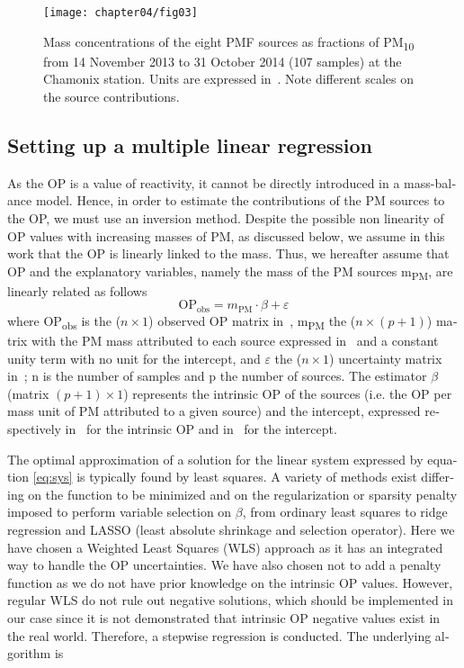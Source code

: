 \begin{otherlanguage}{english}
\begin{figure}[ht]
    \centering
    \texttt{[image: chapter04/fig03]}
    \caption{Mass concentrations of the eight PMF sources as fractions of PM\textsubscript{10} from 14 November 2013 to 31 October 2014 (107 samples)
    at the Chamonix station. Units are expressed in~\si{\ugm}. Note
different scales on the source contributions.  }
    \label{fig:PMFsrc}
\end{figure}

\subsection{Setting up a multiple linear regression}
\label{setting-up-a-multiple-linear-regression}

As the OP is a value of reactivity, it cannot be directly introduced in
a mass-balance model. Hence, in order to estimate the contributions of
the PM sources to the OP, we must use an inversion
method. Despite the possible non linearity of OP values with increasing
masses of PM, as discussed below, we assume in this work that the OP is
linearly linked to the mass. Thus, we hereafter assume that OP and the
explanatory variables, namely the mass of the PM sources
m\textsubscript{PM}, are linearly related as follows
\begin{equation}
    \text{OP}_{\text{obs}} = m_{\text{PM}} \cdot \beta + \varepsilon
    \label{eq:sys}
\end{equation}
where OP\textsubscript{obs} is the ($n\times1$) observed OP matrix in~\si{\opv}, m\textsubscript{PM} the ($n\times(p+1)$)
matrix with the PM mass attributed to each source expressed in~\si{\ugm} and a constant unity term with no unit
for the intercept, and $\varepsilon$ the ($n\times1$) uncertainty matrix
in~\si{\opv}; n is the number of samples and
p the number of sources. The estimator $\beta$ (matrix $(p+1)\times1$) represents
the intrinsic OP of the sources (i.e. the OP per mass unit of PM
attributed to a given source) and the intercept, expressed respectively
in~\si{\opm} for the intrinsic OP and in~\si{\opv} for the intercept.

The optimal approximation of a solution for the linear system expressed
by equation \ref{eq:sys} is typically found by least squares. A variety of
methods exist differing on the function to be minimized and on the
regularization or sparsity penalty imposed to perform variable selection
on $\beta$, from ordinary least squares to ridge regression and LASSO (least
absolute shrinkage and selection operator). Here we have chosen a
Weighted Least Squares (WLS) approach as it has an integrated way to
handle the OP uncertainties. We have also chosen not to add a penalty
function as we do not have prior knowledge on the intrinsic OP values.
However, regular WLS do not rule out negative solutions, which should be
implemented in our case since it is not demonstrated that intrinsic OP
negative values exist in the real world. Therefore, a stepwise
regression is conducted. The underlying algorithm is


\end{otherlanguage}
